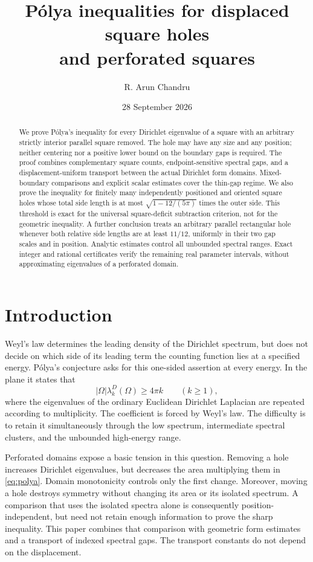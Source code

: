 \documentclass[11pt,reqno]{amsart}
\title[P\'olya inequalities for displaced square holes]{P\'olya inequalities for displaced square holes\texorpdfstring{\\}{ }and perforated squares}
\author{R. Arun Chandru}
\date{28 September 2026}
\numberwithin{equation}{section}
\newcommand{\Om}{\Omega}
\begin{document}
\begin{abstract}
We prove P\'olya's inequality for every Dirichlet eigenvalue of a
square with an arbitrary strictly interior parallel square removed.
The hole may have any size and any position; neither centering nor
a positive lower bound on the boundary gaps is required. The proof
combines complementary square counts, endpoint-sensitive spectral
gaps, and a displacement-uniform transport between the actual
Dirichlet form domains. Mixed-boundary comparisons and explicit
scalar estimates cover the thin-gap regime. We also prove the
inequality for finitely many independently positioned and oriented
square holes whose total side length is at most
$\sqrt{1-12/(5\pi)}$ times the outer side. This threshold is exact
for the universal square-deficit subtraction criterion, not for
the geometric inequality. A further conclusion treats an arbitrary
parallel rectangular hole whenever both relative side lengths are
at least $11/12$, uniformly in their two gap scales and in position.
Analytic estimates control all unbounded spectral ranges. Exact
integer and rational certificates verify the remaining real
parameter intervals, without approximating eigenvalues of a
perforated domain.
\end{abstract}
\maketitle
\tableofcontents

\section{Introduction}\label{sec:introduction}

Weyl's law determines the leading density of the Dirichlet spectrum,
but does not decide on which side of its leading term the counting
function lies at a specified energy. P\'olya's conjecture asks for
this one-sided assertion at every energy. In the plane it states
that
\begin{equation}\label{eq:polya}
 |\Om|\lambda_k^D(\Om)\ge4\pi k\qquad(k\ge1),
\end{equation}
where the eigenvalues of the ordinary Euclidean Dirichlet Laplacian
are repeated according to multiplicity. The coefficient is forced
by Weyl's law. The difficulty is to retain it simultaneously through
the low spectrum, intermediate spectral clusters, and the unbounded
high-energy range.

Perforated domains expose a basic tension in this question.
Removing a hole increases Dirichlet eigenvalues, but decreases the
area multiplying them in \eqref{eq:polya}. Domain monotonicity
controls only the first change. Moreover, moving a hole destroys
symmetry without changing its area or its isolated spectrum. A
comparison that uses the isolated spectra alone is consequently
position-independent, but need not retain enough information to
prove the sharp inequality. This paper combines that comparison
with geometric form estimates and a transport of indexed spectral
gaps. The transport constants do not depend on the displacement.
\end{document}
